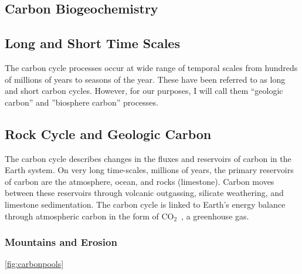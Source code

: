 \documentclass{book}\usepackage{knitr}
\newcommand{\carbondioxide}{CO$_2$~}
\begin{document}
\begin{knitrout}
\begin{kframe}
\section{Carbon Biogeochemistry}

\subsection{Long and Short Time Scales}

The carbon cycle processes occur at wide range of temporal scales from hundreds of millions of years to seasons of the year. These have been referred to as long and short carbon cycles. However, for our purposes, I will call them ``geologic carbon'' and ''biosphere carbon'' processes. 

\subsection{Rock Cycle and Geologic Carbon}

The carbon cycle describes changes in the fluxes and reservoirs of carbon in the Earth system. On very long time-scales, millions of years, the primary reservoirs of carbon are the atmosphere, ocean, and rocks (limestone). Carbon moves between these reservoirs through volcanic outgassing, silicate weathering, and limestone sedimentation. The carbon cycle is linked to Earth's energy balance through atmospheric carbon in the form of \carbondioxide, a greenhouse gas.

\subsubsection{Mountains and Erosion}

\ref{fig:carbonpools}


\end{kframe}
\end{knitrout}
\end{document}
